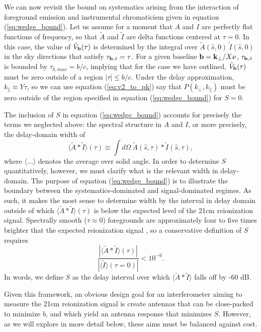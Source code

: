 \documentclass[11pt]{article}
\newcommand{\kvec}{{\bf k}}
\newcommand{\bvec}{{\bf b}}
\newcommand{\shat}{{\hat s}}
\newcommand{\kpr}{{k_\perp}}
\newcommand{\kvpr}{{\kvec_\perp}}
\newcommand{\kpl}{{k_\parallel}}
\newcommand{\AI}{{\langle\tilde A*\tilde I\rangle}}
\newcommand{\AItau}{{\AI(\tau)}}
\begin{document}
We can now revisit the bound on systematics arising from the interaction of foreground emission and
instrumental chromaticism given in equation (\ref{eq:wedge_bound}).  Let us assume for a moment that
$A$ and $I$ are perfectly flat functions of frequency, so that $\tilde A$ and $\tilde I$ are delta functions
centered at $\tau=0$.  In this case, the value of $\tilde V_\bvec(\tau)$ is determined by
the integral over $\tilde A(\shat,0)~\tilde I(\shat,0)$ in the sky directions that satisfy $\tau_{\bvec,\shat}=\tau$.
For a given baseline $\bvec=\kvpr/X\nu$, $\tau_{\bvec,\shat}$ is bounded by $\tau_{b,max}=b/c$, implying that
for the case we have outlined, $\tilde V_\bvec(\tau)$ must be zero outside of a region
$|\tau|\le b/c$.  Under the delay approximation, $\kpl\approx Y\tau$, so we can use equation
(\ref{eq:v2_to_pk}) say that $P(\kpr,\kpl)$ must be zero outside of the region specified in 
equation (\ref{eq:wedge_bound}) for $S=0$.

The inclusion of $S$ in equation (\ref{eq:wedge_bound}) accounts for precisely the terms we neglected above:
the spectral structure in $A$ and $I$, or more precisely, the delay-domain width of 
\begin{equation}
\AItau\equiv\int{d\Omega~\tilde A(\shat,\tau)*\tilde I(\shat,\tau)},
\end{equation}
where $\langle\dots\rangle$ denotes the average over solid angle.
In order to determine $S$ quantitatively, however,
we must clarify what is the relevant width in delay-domain.  The purpose of equation (\ref{eq:wedge_bound}) is 
to illustrate
the boundary between the systematics-dominated and signal-dominated regimes.
As such, it makes the most sense to determine width by the interval in
delay domain outside of which $\AItau$ is below the expected level
of the 21cm reionization signal.  Spectrally smooth ($\tau\approx0$) foregrounds are approximately
four to five times brighter that the expected reionization signal \citep{}, so a conservative definition of
$S$ requires
\begin{equation}
\frac{|\AItau|}{|\langle\tilde I\rangle(\tau=0)|}<10^{-6}.
\label{eq:def_S}
\end{equation}
In words, we define $S$ as the delay interval over which
$\AI$ falls off by -60 dB.

Given this framework, an obvious design goal for an interferometer aiming to 
measure the 21cm reionization signal is create antennas that can be close-packed to minimize $b$, and
which yield an antenna response that minimizes $S$.  However, as we will explore in more detail below, 
these aims must be balanced against cost.
\end{document}
